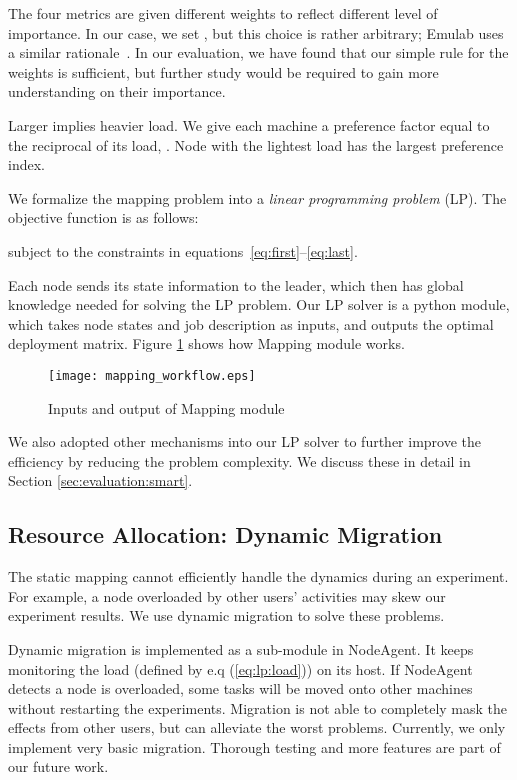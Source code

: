 \documentclass[conference]{IEEEtran}
\begin{document}
The four metrics are given different weights to reflect different
level of importance. In our case, we set , but
this choice is rather arbitrary; Emulab uses a similar
rationale~\cite{White:osdi02}. In our evaluation, we have found that
our simple rule for the weights is sufficient, but further study would
be required to gain more understanding on their importance.





Larger  implies heavier load.  We give each machine a preference
factor  equal to the reciprocal of its load, . Node with
the lightest load has the largest preference index.

We formalize the mapping problem into a \textit{linear programming
  problem} (LP). The objective function is as follows:


subject to the constraints in
equations~\eqref{eq:first}--\eqref{eq:last}.

Each node sends its state information to the leader, which then has
global knowledge needed for solving the LP problem. Our LP solver is a
python module, which takes node states and job description as inputs,
and outputs the optimal deployment matrix. Figure
\ref{sec:architecture:mapping} shows how Mapping module works.

\begin{figure}[!tb]
  \centering
  \texttt{[image: mapping\_workflow.eps]}
  \caption{Inputs and output of Mapping module}
  \label{sec:architecture:mapping}
\end{figure}

We also adopted other mechanisms into our LP solver to further improve
the efficiency by reducing the problem complexity. We discuss these in
detail in Section \ref{sec:evaluation:smart}.




\subsection{Resource Allocation: Dynamic Migration}
\label{sec:architecture:allocation:migration}

The static mapping cannot efficiently handle the dynamics during an
experiment.  For example, a node overloaded by other users' activities
may skew our experiment results. We use dynamic migration to solve
these problems.

Dynamic migration is implemented as a sub-module in NodeAgent. It
keeps monitoring the load (defined by e.q (\ref{eq:lp:load})) on its
host.  If NodeAgent detects a node is overloaded, some tasks will be
moved onto other machines without restarting the
experiments. Migration is not able to completely mask the effects from
other users, but can alleviate the worst problems. Currently, we only
implement very basic migration. Thorough testing and more features are
part of our future work.
\end{document}
